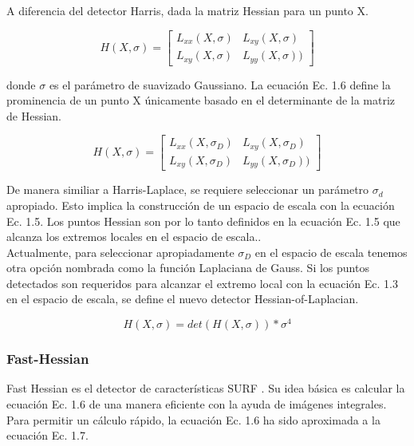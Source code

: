 A diferencia del detector Harris, dada la matriz Hessian para un punto X.

\[
H(X, \sigma) = \begin{bmatrix}
 L_{xx}(X, \sigma) &  L_{xy}(X, \sigma)  \\ 
 L_{xy}(X, \sigma)  &  L_{yy}(X, \sigma))
\end{bmatrix}
\]

donde $\sigma$ es el parámetro de suavizado Gaussiano. La ecuación Ec. 1.6 define la prominencia de un punto X únicamente basado en el determinante de la matriz de Hessian. 

\[
H(X, \sigma) = \begin{bmatrix}
 L_{xx}(X, \sigma_{D}) &  L_{xy}(X, \sigma_{D})  \\ 
 L_{xy}(X, \sigma_{D})  &  L_{yy}(X, \sigma_{D}))
\end{bmatrix}
\]

De manera similiar a Harris-Laplace, se requiere seleccionar un parámetro $\sigma_{d}$ apropiado. Esto implica la construcción de un espacio de escala con la ecuación Ec. 1.5. Los puntos Hessian son por lo tanto definidos en la ecuación Ec. 1.5 que alcanza los extremos locales en el espacio de escala.. \\

Actualmente, para seleccionar apropiadamente $\sigma_{D}$ en el espacio de escala tenemos otra opción nombrada como la función Laplaciana de Gauss. Si los puntos detectados son requeridos para alcanzar el extremo local con la ecuación Ec. 1.3 en el espacio de escala, se define el nuevo detector Hessian-of-Laplacian. 

\[
H(X,\sigma) = det(H(X,\sigma))  *  \sigma^{4}
\]

\begin{table}[htbp]
\begin{center}
\end{center}
\end{table}

\begin{table}[htbp]
\begin{center}
\end{center}
\end{table}

\subsubsection{Fast-Hessian}
Fast Hessian es el detector de características SURF \cite{Reference27}. Su idea básica es calcular la ecuación Ec. 1.6 de una manera eficiente con la ayuda de imágenes integrales. Para permitir un cálculo rápido, la ecuación Ec. 1.6 ha sido aproximada a la ecuación Ec. 1.7.

